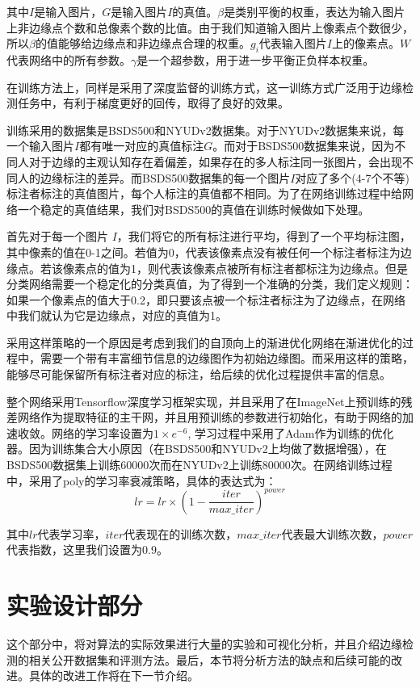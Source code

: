 \documentclass[master]{thesis-uestc}
\begin{document}
{其中$I$是输入图片，$G$是输入图片$I$的真值。$\beta$是类别平衡的权重，表达为输入图片上非边缘点个数和总像素个数的比值。由于我们知道输入图片上像素点个数很少，所以$\beta$的值能够给边缘点和非边缘点合理的权重。$g_i$代表输入图片$I$上的像素点。$W$代表网络中的所有参数。$\gamma$是一个超参数，用于进一步平衡正负样本权重。

在训练方法上，同样是采用了深度监督的训练方式，这一训练方式广泛用于边缘检测任务中，有利于梯度更好的回传，取得了良好的效果。

训练采用的数据集是BSDS500和NYUDv2数据集。对于NYUDv2数据集来说，每一个输入图片$I$都有唯一对应的真值标注$G$。而对于BSDS500数据集来说，因为不同人对于边缘的主观认知存在着偏差，如果存在的多人标注同一张图片，会出现不同人的边缘标注的差异。而BSDS500数据集的每一个图片$I$对应了多个(4-7个不等)标注者标注的真值图片，每个人标注的真值都不相同。为了在网络训练过程中给网络一个稳定的真值结果，我们对BSDS500的真值在训练时候做如下处理。

首先对于每一个图片 $I$，我们将它的所有标注进行平均，得到了一个平均标注图，其中像素的值在0-1之间。若值为0，代表该像素点没有被任何一个标注者标注为边缘点。若该像素点的值为1，则代表该像素点被所有标注者都标注为边缘点。但是分类网络需要一个稳定化的分类真值，为了得到一个准确的分类，我们定义规则：如果一个像素点的值大于0.2，即只要该点被一个标注者标注为了边缘点，在网络中我们就认为它是边缘点，对应的真值为1。

采用这样策略的一个原因是考虑到我们的自顶向上的渐进优化网络在渐进优化的过程中，需要一个带有丰富细节信息的边缘图作为初始边缘图。而采用这样的策略，能够尽可能保留所有标注者对应的标注，给后续的优化过程提供丰富的信息。

整个网络采用Tensorflow深度学习框架实现，并且采用了在ImageNet上预训练的残差网络作为提取特征的主干网，并且用预训练的参数进行初始化，有助于网络的加速收敛。网络的学习率设置为$1 \times e^{-6}$, 学习过程中采用了Adam作为训练的优化器。因为训练集合大小原因（在BSDS500和NYUDv2上均做了数据增强），在BSDS500数据集上训练60000次而在NYUDv2上训练80000次。在网络训练过程中，采用了poly的学习率衰减策略，具体的表达式为：
\begin{equation}
    lr = lr \times (1 - \frac{iter}{max\_iter})^{power}
\end{equation}

其中$lr$代表学习率，$iter$代表现在的训练次数，$max\_iter$代表最大训练次数，$power$代表指数，这里我们设置为0.9。

\section{实验设计部分}
这个部分中，将对算法的实际效果进行大量的实验和可视化分析，并且介绍边缘检测的相关公开数据集和评测方法。最后，本节将分析方法的缺点和后续可能的改进。具体的改进工作将在下一节介绍。
}
\end{document}

